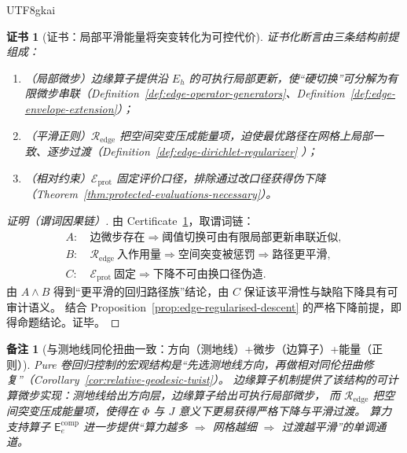 \documentclass[12pt]{article}
\newtheorem{remark}{备注}[section]
\newtheorem{certificate}{证书}[section]
\begin{document}
\begin{CJK*}{UTF8}{gkai}
\begin{certificate}[证书：局部平滑能量将突变转化为可控代价]
\label{cert:edge-regularised-descent}
证书化断言由三条结构前提组成：
\begin{enumerate}
  \item（局部微步）边缘算子提供沿 $E_h$ 的可执行局部更新，使“硬切换”可分解为有限微步串联（Definition~\ref{def:edge-operator-generators}、Definition~\ref{def:edge-envelope-extension}）；
  \item（平滑正则）$\mathcal{R}_{\mathrm{edge}}$ 把空间突变压成能量项，迫使最优路径在网格上局部一致、逐步过渡（Definition~\ref{def:edge-dirichlet-regularizer}
    ）；
  \item（相对约束）$\mathcal{E}_{\mathrm{prot}}$ 固定评价口径，排除通过改口径获得伪下降（Theorem~\ref{thm:protected-evaluations-necessary}）。
\end{enumerate}
\end{certificate}

\begin{proof}[证明（谓词因果链）]
由 Certificate~\ref{cert:edge-regularised-descent}，取谓词链：
\[
\begin{aligned}
A:&\ \text{边微步存在}\Rightarrow \text{阈值切换可由有限局部更新串联近似},\\
B:&\ \mathcal{R}_{\mathrm{edge}}\ \text{入作用量}\Rightarrow \text{空间突变被惩罚}\Rightarrow \text{路径更平滑},\\
C:&\ \mathcal{E}_{\mathrm{prot}}\ \text{固定}\Rightarrow \text{下降不可由换口径伪造}.
\end{aligned}
\]
由 $A\wedge B$ 得到“更平滑的回归路径族”结论，由 $C$ 保证该平滑性与缺陷下降具有可审计语义。
结合 Proposition~\ref{prop:edge-regularised-descent} 的严格下降前提，即得命题结论。证毕。
\end{proof}

\begin{remark}[与测地线同伦扭曲一致：方向（测地线）+微步（边算子）+能量（正则）]
Pure 卷回归控制的宏观结构是“先选测地线方向，再做相对同伦扭曲修复”（Corollary~\ref{cor:relative-geodesic-twist}）。
边缘算子机制提供了该结构的可计算微步实现：测地线给出方向层，边缘算子给出可执行局部微步，
而 $\mathcal{R}_{\mathrm{edge}}$ 把空间突变压成能量项，使得在 $\Phi$ 与 $J$ 意义下更易获得严格下降与平滑过渡。
算力支持算子 $\mathsf{E}^{\mathrm{comp}}_{e}$ 进一步提供“算力越多 $\Rightarrow$ 网格越细 $\Rightarrow$ 过渡越平滑”的单调通道。
\end{remark}

\clearpage

\end{CJK*}
\end{document}
